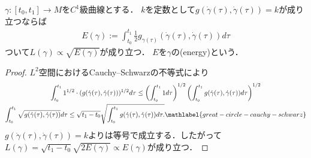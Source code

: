 \documentclass{ltjsarticle}
\begin{document}
\begin{thmbox}
\begin{proposition}
\(\gamma \colon [t_0, t_1] \to M\)を\(C^1\)級曲線とする．
\(k\)を定数として\(g(\dot{\gamma}(\tau), \dot{\gamma}(\tau)) = k\)が成り立つならば
\begin{align*}
    E(\gamma) := \int_{t_0}^{t_1} \frac{1}{2} g_{\gamma(\tau)}(\dot{\gamma}(\tau), \dot{\gamma}(\tau)) d\tau
\end{align*}
ついて\(L(\gamma) \propto \sqrt{E(\gamma)}\)が成り立つ．
\(E\)を\(\gamma\)の(energy)という．
\end{proposition}
\end{thmbox}

\begin{proof}
\(L^2\)空間におけるCauchy--Schwarzの不等式により
\begin{gather}
    \int_{t_0}^{t_1} 1^{\inlinefrac{1}{2}} \cdot (g(\dot{\gamma}(\tau), \dot{\gamma}(\tau)))^{\inlinefrac{1}{2}} d\tau
    \leq
    \left(\int_{t_0}^{t_1} 1 d\tau\right)^{\inlinefrac{1}{2}}
    \left(\int_{t_0}^{t_1} g(\dot{\gamma}(\tau), \dot{\gamma}(\tau)) d\tau\right)^{\inlinefrac{1}{2}} \notag \\
    \int_{t_0}^{t_1} \sqrt{g(\dot{\gamma}(\tau), \dot{\gamma}(\tau))} d\tau
    \leq
    \sqrt{t_1 - t_0}
    \sqrt{%
        \int_{t_0}^{t_1} g(\dot{\gamma}(\tau), \dot{\gamma}(\tau)) d\tau.
    }
    \mathlabel{great-circle-cauchy-schwarz}
\end{gather}
\(g(\dot{\gamma}(\tau), \dot{\gamma}(\tau)) = k\)よりは等号で成立する．したがって\(L(\gamma) = \sqrt{t_1 - t_0}\sqrt{2 E(\gamma)} \propto E(\gamma)\)が成り立つ．
\end{proof}
\end{document}
